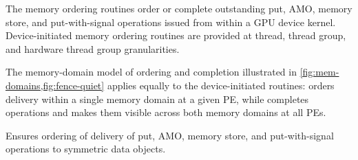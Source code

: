 
The memory ordering routines order or complete outstanding put, \ac{AMO}, memory
store, and put-with-signal operations issued from within a \ac{GPU} device
kernel. Device-initiated memory ordering routines are provided at thread, thread
group, and hardware thread group granularities.

The memory-domain model of ordering and completion illustrated in
\cref{fig:mem-domains,fig:fence-quiet} applies equally to the device-initiated
routines:  orders delivery within a single memory domain at
a given \ac{PE}, while  completes operations and makes them
visible across both memory domains at all \acp{PE}.

\label{subsec:gc_fence}

Ensures ordering of delivery of put, \ac{AMO}, memory store, and put-with-signal
operations to symmetric data objects.

